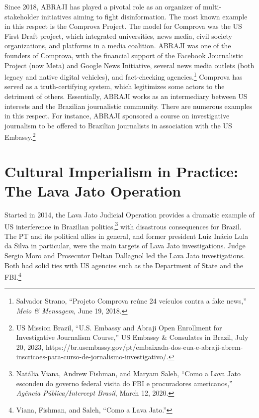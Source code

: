 \documentclass{tufte-handout}
\begin{document}
Since 2018, ABRAJI has played a pivotal role as an organizer of
multi-stakeholder initiatives aiming to fight disinformation. The most
known example in this respect is the Comprova Project. The model for
Comprova was the US First Draft project, which integrated universities,
news media, civil society organizations, and platforms in a media
coalition. ABRAJI was one of the founders of Comprova, with the
financial support of the Facebook Journalistic Project (now Meta) and
Google News Initiative, several news media outlets (both legacy and
native digital vehicles), and fact-checking agencies.\footnote{Salvador
  Strano, ``Projeto Comprova reúne 24 veículos contra a fake news,''
  \emph{Meio \& Mensagem}, June 19, 2018.} Comprova has served as a
truth-certifying system, which legitimizes some actors to the detriment
of others. Essentially, ABRAJI works as an intermediary between US
interests and the Brazilian journalistic community. There are numerous
examples in this respect. For instance, ABRAJI sponsored a course on
investigative journalism to be offered to Brazilian journalists in
association with the US Embassy.\footnote{US Mission Brazil, ``U.S.
  Embassy and Abraji Open Enrollment for Investigative Journalism
  Course,'' US Embassy \& Consulates in Brazil, July 20, 2023,
  https://br.usembassy.gov/pt/embaixada-dos-eua-e-abraji-abrem-inscricoes-para-curso-de-jornalismo-investigativo/.}

\hypertarget{cultural-imperialism-in-practice-the-lava-jato-operation}{%
\section{Cultural Imperialism in Practice: The Lava Jato
Operation}\label{cultural-imperialism-in-practice-the-lava-jato-operation}}

Started in 2014, the Lava Jato Judicial Operation provides a dramatic
example of US interference in Brazilian politics,\footnote{Natália
  Viana, Andrew Fishman, and Maryam Saleh, ``Como a Lava Jato escondeu
  do governo federal visita do FBI e procuradores americanos,''
  \emph{Agência Pública/Intercept Brasil}, March 12, 2020.} with
disastrous consequences for Brazil. The PT and its political allies in
general, and former president Luiz Inácio Lula da Silva in particular,
were the main targets of Lava Jato investigations. Judge Sergio Moro and
Prosecutor Deltan Dallagnol led the Lava Jato investigations. Both had
solid ties with US agencies such as the Department of State and the
FBI.\footnote{Viana, Fishman, and Saleh, ``Como a Lava Jato.''}
\end{document}
